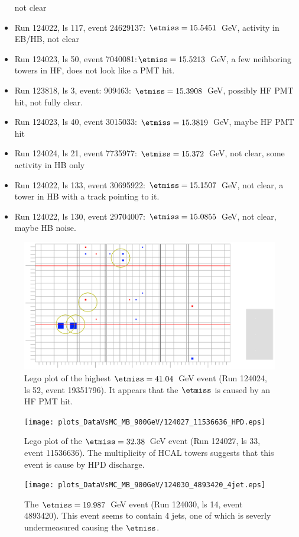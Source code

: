 \begin{itemize}
not clear
\item Run 124022, ls 117, event 24629137: $\etmiss=15.5451$~GeV, activity in
EB/HB, not clear
\item Run 124023, ls 50, event 7040081:$\etmiss=15.5213$~GeV, a few neihboring
towers in HF, does not look like a PMT hit.
\item Run 123818, ls 3, event: 909463: $\etmiss=15.3908$~GeV, possibly HF PMT
hit, not fully clear.
\item Run 124023, ls 40, event 3015033: $\etmiss=15.3819$~GeV, maybe HF PMT
hit
\item Run 124024, ls 21,  event 7735977: $\etmiss=15.372$~GeV, not clear, some
activity in HB only
\item Run 124022, ls 133, event 30695922: $\etmiss=15.1507$~GeV, not clear, a
tower in HB with a track pointing to it.
\item Run 124022, ls 130, event 29704007: $\etmiss=15.0855$~GeV, not clear,
maybe HB noise.
\end{itemize}

\begin{figure}[h!]
  \includegraphics[width=12cm]{plots_DataVsMC_MB_900GeV/124024_19351796_MET41GeV.eps}
  \caption{Lego plot of the highest $\etmiss=41.04$~GeV event (Run 124024, ls 52, event 19351796). It appears
    that the $\etmiss$ is caused by an HF PMT hit.
    \label{fig:DataVsMC_MB_900_evd1}}
\end{figure}

\begin{figure}[h!]
  \texttt{[image: plots\_DataVsMC\_MB\_900GeV/124027\_11536636\_HPD.eps]}
  \caption{Lego plot of the $\etmiss=32.38$~GeV event (Run 124027, ls 33, event 11536636). The multiplicity
    of HCAL towers suggests that this event is cause by HPD discharge.
    \label{fig:DataVsMC_MB_900_evd2}}
\end{figure}

\begin{figure}[h!]
  \texttt{[image: plots\_DataVsMC\_MB\_900GeV/124030\_4893420\_4jet.eps]}
  \caption{The $\etmiss=19.987$~GeV event (Run 124030, ls
    14, event 4893420). This event seems to contain 4 jets, one of which
    is severly undermeasured causing the $\etmiss$.
    \label{fig:DataVsMC_MB_900_evd3}}
\end{figure}


